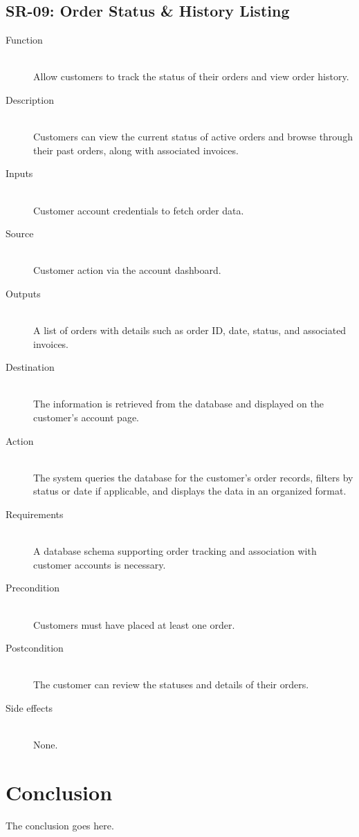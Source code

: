 \documentclass[a4paper,journal]{IEEEtran}
\begin{document}
\subsection{SR-09: Order Status \& History Listing}
\begin{description}
  \item[Function] \hfill \\
  Allow customers to
  track the status of their orders and view order history.
  \item[Description] \hfill \\
  Customers can view the current status of active orders
  and browse through their past orders, along with associated invoices.
  \item[Inputs] \hfill \\
  Customer account credentials to fetch order data.
  \item[Source] \hfill \\
  Customer action via the account dashboard.
  \item[Outputs] \hfill \\
  A list of orders with details such as order ID, date,
  status, and associated invoices.
  \item[Destination] \hfill \\
  The information is retrieved from the database and
  displayed on the customer’s account page.
  \item[Action] \hfill \\
  The system queries the database for the customer’s
  order records, filters by status or date if applicable, and displays the data
  in an organized format.
  \item[Requirements] \hfill \\
  A database schema supporting order tracking and
  association with customer accounts is necessary.
  \item[Precondition] \hfill \\
  Customers must have placed at least one order.
  \item[Postcondition] \hfill \\
  The customer can review the statuses and details of
  their orders.
  \item[Side effects] \hfill \\
  None.
\end{description}

\section{Conclusion}
The conclusion goes here.
\end{document}
